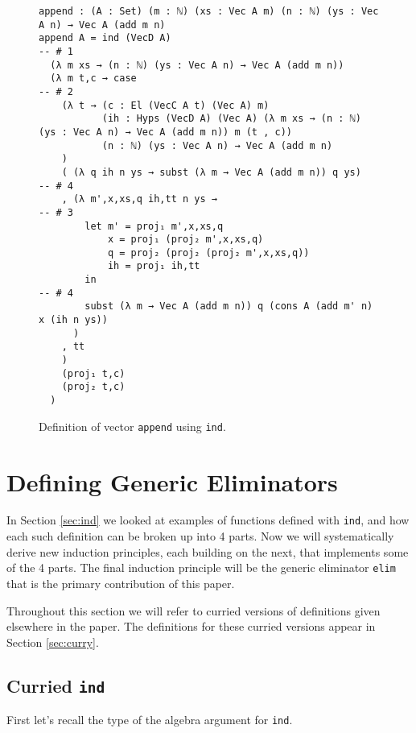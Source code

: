 \documentclass[preprint,nonatbib]{sigplanconf}
\begin{document}
\begin{figure*}
\caption{Definition of vector {\tt append} using {\tt ind}.}
\label{fig:ind:append}

\begin{verbatim}
append : (A : Set) (m : ℕ) (xs : Vec A m) (n : ℕ) (ys : Vec A n) → Vec A (add m n) 
append A = ind (VecD A)                                         -- # 1
  (λ m xs → (n : ℕ) (ys : Vec A n) → Vec A (add m n)) 
  (λ m t,c → case                                               -- # 2
    (λ t → (c : El (VecC A t) (Vec A) m)
           (ih : Hyps (VecD A) (Vec A) (λ m xs → (n : ℕ) (ys : Vec A n) → Vec A (add m n)) m (t , c))
           (n : ℕ) (ys : Vec A n) → Vec A (add m n)
    )
    ( (λ q ih n ys → subst (λ m → Vec A (add m n)) q ys)       -- # 4
    , (λ m',x,xs,q ih,tt n ys →                                -- # 3
        let m' = proj₁ m',x,xs,q
            x = proj₁ (proj₂ m',x,xs,q)
            q = proj₂ (proj₂ (proj₂ m',x,xs,q))
            ih = proj₁ ih,tt
        in                                                      -- # 4
        subst (λ m → Vec A (add m n)) q (cons A (add m' n) x (ih n ys))
      )
    , tt
    )
    (proj₁ t,c)
    (proj₂ t,c)
  )
\end{verbatim}

\end{figure*}

\section{Defining Generic Eliminators}
\label{sec:elim}

In Section \ref{sec:ind} we looked at examples of functions defined
with {\tt ind}, and how each such definition can be broken up into 4
parts. Now we will systematically derive new induction principles,
each building on the next, that implements some of the 4 parts. The
final induction principle will be the generic eliminator {\tt elim}
that is the primary contribution of this paper. 

Throughout this section we will refer to curried versions of
definitions given elsewhere in the paper. The definitions for these
curried versions appear in Section \ref{sec:curry}.

\subsection{Curried {\tt ind}}

First let's recall the type of the algebra argument for {\tt ind}.
\end{document}
